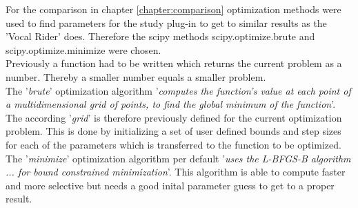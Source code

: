 For the comparison in chapter \ref{chapter:comparison} optimization methods were used to find parameters for the study plug-in to get to similar results as the 'Vocal Rider' does. Therefore the scipy\cite{scipy} methods scipy.optimize.brute and scipy.optimize.minimize were chosen.\\
Previously a function had to be written which returns the current problem as a number. Thereby a smaller number equals a smaller problem.\\
The '\textit{brute}' optimization algorithm '\textit{computes the function’s value at each point of a multidimensional grid of points, to find the global minimum of the function}'\cite{scipyB}. The according '\textit{grid}' is therefore previously defined for the current optimization problem. This is done by initializing a set of user defined bounds and step sizes for each of the parameters which is transferred to the function to be optimized.\\
The '\textit{minimize}' optimization algorithm per default '\textit{uses the L-BFGS-B algorithm ... for bound constrained minimization}'\cite{scipyM}. This algorithm is able to compute faster and more selective but needs a good inital parameter guess to get to a proper result.\\

